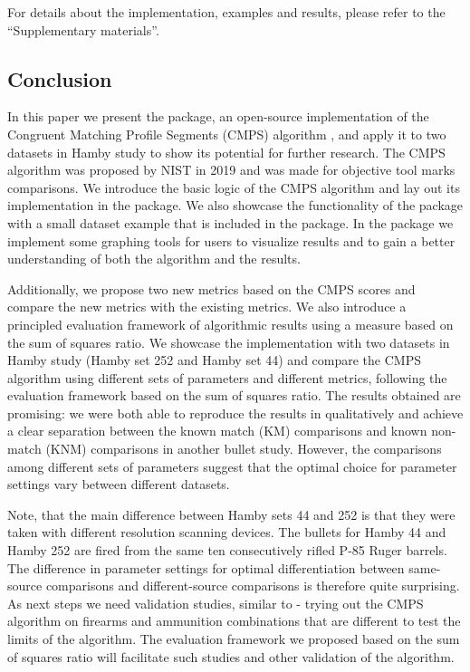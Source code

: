 For details about the implementation, examples and results, please refer
to the ``Supplementary materials''.

\hypertarget{conclusion}{%
\subsection{Conclusion}\label{conclusion}}

In this paper we present the  package, an open-source
implementation of the Congruent Matching Profile Segments (CMPS)
algorithm \citep{cmps}, and apply it to two datasets in Hamby study
\citep{hamby} to show its potential for further research. The CMPS
algorithm was proposed by NIST in 2019 and was made for objective tool
marks comparisons. We introduce the basic logic of the CMPS algorithm
and lay out its implementation in the  package. We also
showcase the functionality of the  package with a small
dataset example that is included in the package. In the 
package we implement some graphing tools for users to visualize results
and to gain a better understanding of both the algorithm and the
results.

Additionally, we propose two new metrics based on the CMPS scores and
compare the new metrics with the existing metrics. We also introduce a
principled evaluation framework of algorithmic results using a measure
based on the sum of squares ratio. We showcase the implementation with
two datasets in Hamby study (Hamby set 252 and Hamby set 44) and compare
the CMPS algorithm using different sets of parameters and different
metrics, following the evaluation framework based on the sum of squares
ratio. The results obtained are promising: we were both able to
reproduce the results in \citet{cmps} qualitatively and achieve a clear
separation between the known match (KM) comparisons and known non-match
(KNM) comparisons in another bullet study. However, the comparisons
among different sets of parameters suggest that the optimal choice for
parameter settings vary between different datasets.

Note, that the main difference between Hamby sets 44 and 252 is that
they were taken with different resolution scanning devices. The bullets
for Hamby 44 and Hamby 252 are fired from the same ten consecutively
rifled P-85 Ruger barrels. The difference in parameter settings for
optimal differentiation between same-source comparisons and
different-source comparisons is therefore quite surprising. As next
steps we need validation studies, similar to \citet{vanderplas} - trying
out the CMPS algorithm on firearms and ammunition combinations that are
different to test the limits of the algorithm. The evaluation framework
we proposed based on the sum of squares ratio will facilitate such
studies and other validation of the algorithm.


